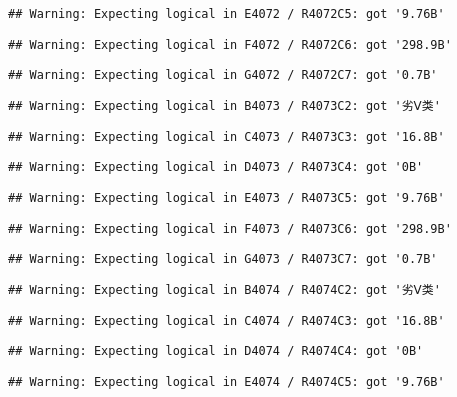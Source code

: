\documentclass[
]{article}
\begin{document}
\begin{verbatim}
## Warning: Expecting logical in E4072 / R4072C5: got '9.76B'
\end{verbatim}

\begin{verbatim}
## Warning: Expecting logical in F4072 / R4072C6: got '298.9B'
\end{verbatim}

\begin{verbatim}
## Warning: Expecting logical in G4072 / R4072C7: got '0.7B'
\end{verbatim}

\begin{verbatim}
## Warning: Expecting logical in B4073 / R4073C2: got '劣Ⅴ类'
\end{verbatim}

\begin{verbatim}
## Warning: Expecting logical in C4073 / R4073C3: got '16.8B'
\end{verbatim}

\begin{verbatim}
## Warning: Expecting logical in D4073 / R4073C4: got '0B'
\end{verbatim}

\begin{verbatim}
## Warning: Expecting logical in E4073 / R4073C5: got '9.76B'
\end{verbatim}

\begin{verbatim}
## Warning: Expecting logical in F4073 / R4073C6: got '298.9B'
\end{verbatim}

\begin{verbatim}
## Warning: Expecting logical in G4073 / R4073C7: got '0.7B'
\end{verbatim}

\begin{verbatim}
## Warning: Expecting logical in B4074 / R4074C2: got '劣Ⅴ类'
\end{verbatim}

\begin{verbatim}
## Warning: Expecting logical in C4074 / R4074C3: got '16.8B'
\end{verbatim}

\begin{verbatim}
## Warning: Expecting logical in D4074 / R4074C4: got '0B'
\end{verbatim}

\begin{verbatim}
## Warning: Expecting logical in E4074 / R4074C5: got '9.76B'
\end{verbatim}
\end{document}
